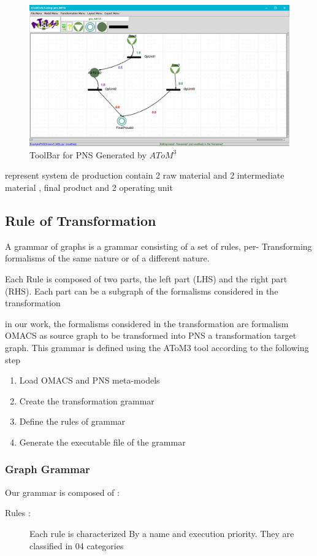 \begin{figure}[th]
	\centering
 	\includegraphics[scale=0.3]{Chapiter3/img/pns_model}
	\caption{\label{fig:PNS Model}ToolBar for PNS Generated by $AToM^3$}
\end{figure} 

represent system de production contain 2 raw material and 2 intermediate material , final product
and 2 operating unit 





\pagebreak
\subsection{ Rule of Transformation }
A grammar of graphs is a grammar consisting of a set of rules, per-
Transforming formalisms of the same nature or of a different nature. 

Each Rule is composed of two parts, the left part (LHS) and the right part (RHS).
Each part can be a subgraph of the formalisms considered in the transformation

in our work, the formalisms considered in the transformation are formalism
OMACS as source graph to be transformed into PNS a transformation target graph.
This grammar is defined using the AToM3 tool according to the following step

\begin{enumerate}
	\item Load OMACS and PNS meta-models
	\item Create the transformation grammar
	\item Define the rules of grammar
	\item Generate the executable file of the grammar
\end{enumerate}
 
\subsubsection{ Graph Grammar }
Our grammar is composed of :
\begin{description}

\item [{Rules :}]  

Each rule is characterized
By a name and execution priority. They are classified in 04 categories

\end{description}

